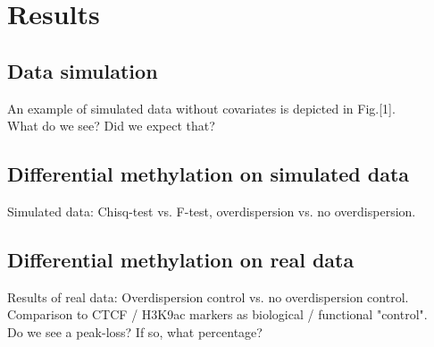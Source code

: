 \section{Results}

\subsection{Data simulation}
An example of simulated data without covariates is depicted in Fig.[1].\\
What do we see? Did we expect that?

\subsection{Differential methylation on simulated data}
Simulated data: Chisq-test vs. F-test, overdispersion vs. no overdispersion.

\subsection{Differential methylation on real data}
Results of real data: Overdispersion control vs. no overdispersion control.\\
Comparison to CTCF / H3K9ac markers as biological / functional "control".\\
Do we see a peak-loss? If so, what percentage?
  
  
  
  